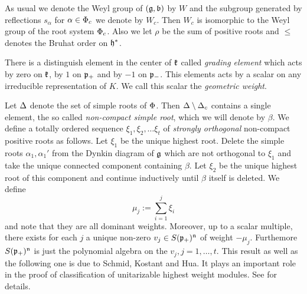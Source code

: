 As usual we denote the Weyl group of $(\mathfrak{g},\mathfrak{b})$ by $W$ and the subgroup generated by reflections $s_\alpha$ for $\alpha\in \Phi_c$ we denote by $W_c$. Then $W_c$ is isomorphic to the Weyl group of the root system $\Phi_c$. Also we let $\rho$ be the sum of positive roots and $\leq$ denotes the Bruhat order on $\mathfrak{h}^*$.

There is a distinguish element in the center of $\mathfrak{k}$ called \emph{grading element} which acts by zero on $\mathfrak{k}$, by $1$ on $\mathfrak{p}_+$ and by $-1$ on $\mathfrak{p}_-$. This elements acts by a scalar on any irreducible representation of $K$. We call this scalar the \emph{geometric weight}.

Let $\Delta$ denote the set of  simple roots of $\Phi$. Then $\Delta\setminus \Delta_c$ contains a single element, the so called \emph{non-compact simple root}, which we will denote by $\beta$. We define a totally ordered sequence $\xi_1,\xi_2,\ldots \xi_t$ of \emph{strongly orthogonal} non-compact positive roots as follows. Let $\xi_1$ be the unique highest root. Delete the simple roots $\alpha_1,\alpha_1'$ from the Dynkin diagram of $\mathfrak{g}$ which are not orthogonal to $\xi_1$ and take the unique connected component containing $\beta$. Let $\xi_2$ be the unique highest root of this component and continue inductively until $\beta$ itself is deleted. We define
\[\mu_j := \sum_{i=1}^j \xi_i\]
and note that they are all dominant weights. Moreover, up to a scalar multiple, there exists for each $j$ a unique non-zero $v_j\in S(\mathfrak{p}_+)^{\mathfrak{n}}$ of weight $-\mu_j.$ Furthemore $S(\mathfrak{p}_+)^{\mathfrak{n}}$ is just the polynomial algebra on the $v_j,j=1,\ldots, t.$ This result as well as the following one is due to Schmid, Kostant and Hua. It plays an important role in the proof of classification of unitarizable highest weight modules. See \cite{enright_intrinsic_1990} for details.

